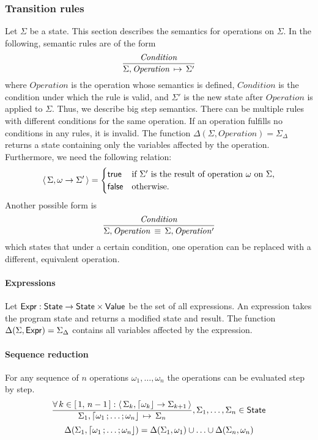 \subsubsection{Transition rules}
Let $\Sigma$ be a state.
This section describes the semantics for operations on $\Sigma$.
In the following, semantic rules are of the form
	$$\frac{\mathit{Condition}}{{\Sigma, \mathit{Operation}} \,\mapsto\, \Sigma'}$$
	where
		$\mathit{Operation}$ is the operation whose semantics is defined,
		$\mathit{Condition}$ is the condition under which the rule is valid, and
		$\Sigma'$ is the new state after $\mathit{Operation}$ is applied to $\Sigma$.
Thus, we describe big step semantics.
There can be multiple rules with different conditions for the same operation.
If an operation fulfills no conditions in any rules, it is invalid.
The function $\Delta(\Sigma, \mathit{Operation}) = \Sigma_\Delta$ returns a state containing only the variables affected by the operation.
Furthermore, we need the following relation:
$$\left\langle\, \Sigma, \omega \to \Sigma' \,\right\rangle = \begin{cases}
	\mathsf{true} & \text{if $\Sigma'$ is the result of operation $\omega$ on $\Sigma$,} \\
	\mathsf{false} & \text{otherwise.}
\end{cases}
$$
Another possible form is
$$
\frac{\mathit{Condition}}{\Sigma, \mathit{Operation} \,\equiv\, \Sigma, \mathit{Operation'}}
$$
which states that under a certain condition, one operation can be replaced with a different, equivalent operation.

\paragraph{Expressions}
Let $\mathsf{Expr}: \mathsf{State} \to \mathsf{State} \times \mathsf{Value}$ be the set of all expressions.
An expression takes the program state and returns a modified state and result.
The function $\Delta(\Sigma, \mathsf{Expr}) = \Sigma_{\Delta}$ contains all variables affected by the expression.

\paragraph{Sequence reduction}
For any sequence of $n$ operations $\omega_1, \ldots, \omega_n$ the operations can be evaluated step by step.
$$
\semrule{
	\forall\, k \in \range{1}{n-1}: \results{\Sigma_k}{\stmt{\omega_k}}{\Sigma_{k+1}}}
	{\Sigma_1, \stmt{\omega_1}{\ldots}{\omega_n}}
	{\Sigma_n},
	\Sigma_1, \ldots, \Sigma_n \in \State
$$
$$
	\Delta(\Sigma_1, \stmt{\omega_1}{\ldots}{\omega_n}) =
		\Delta(\Sigma_1, \omega_1) \cup \ldots \cup \Delta(\Sigma_n, \omega_n)
$$

